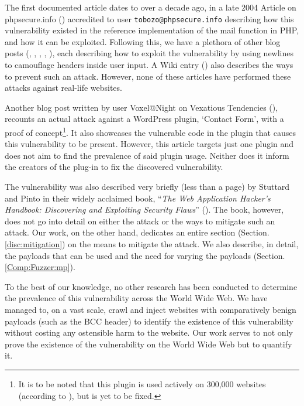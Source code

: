 The first documented article dates to over a decade ago, in a late 2004 Article on phpsecure.info (\cite{Tobozo}) accredited to user \lstinline|tobozo@phpsecure.info| describing how this vulnerability existed in the reference implementation of the mail function in PHP, and how it can be exploited. Following this, we have a plethora of other blog posts (\cite{Calin}, \cite{DK}, \cite{Injection2}, \cite{Nicol}, \cite{Pope}), each describing how to exploit the vulnerability by using newlines to camouflage headers inside user input. A Wiki entry (\cite{Injection}) also describes the ways to prevent such an attack. However, none of these articles have performed these attacks against real-life websites.

Another blog post written by user Voxel@Night on Vexatious Tendencies (\cite{Tendencies2014}), recounts an actual attack against a WordPress plugin, `Contact Form', with a proof of concept\footnote{It is to be noted that this plugin is used actively on 300,000 websites (according to \cite{BestWebSoft2016}), but is yet to be fixed.}. It also showcases the vulnerable code in the plugin that causes this vulnerability to be present. However, this article targets just one plugin and does not aim to find the prevalence of said plugin usage. Neither does it inform the creators of the plug-in to fix the discovered vulnerability.

The vulnerability was also described very briefly (less than a page) by Stuttard and Pinto in their widely acclaimed book, ``\emph{The Web Application Hacker's Handbook: Discovering and Exploiting Security Flaws}'' (\cite{stuttard2011web}). The book, however, does not go into detail on either the attack or the ways to mitigate such an attack. Our work, on the other hand, dedicates an entire section (Section. \ref{disc:mitigation}) on the means to mitigate the attack. We also describe, in detail, the payloads that can be used and the need for varying the payloads (Section. \ref{Comp:Fuzzer:mp}).

To the best of our knowledge, no other research has been conducted to determine the prevalence of this vulnerability across the World Wide Web. We have managed to,  on a vast scale, crawl and inject websites with comparatively benign payloads (such as the BCC header) to identify the existence of this vulnerability without costing any ostensible harm to the website. Our work serves to not only prove the existence of the vulnerability on the World Wide Web but to quantify it.

